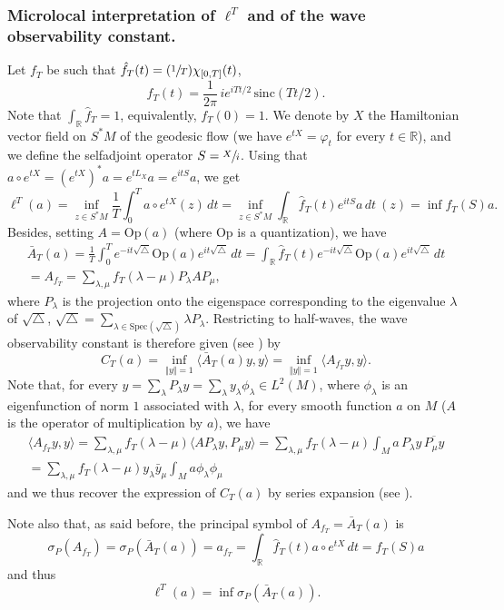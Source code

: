 \documentclass[10pt]{amsart}
\newcommand{\Psfrac}[2]{(\sfrac{#1}{#2})}
\def\R{\mathbb{R}}
\newcommand{\Op}{\mathrm{Op}}
\theoremstyle{definition}
\begin{document}
\subsubsection*{Microlocal interpretation of $\ell^T$ and of the wave observability constant.}
Let $f_T$ be such that $\hat f_T(t) = \Psfrac{1}{T}\chi_{[0,T]}(t)$, \ie
\[
f_T(t)=\frac{1}{2\pi}\,ie^{iTt/2}\,\mathrm{sinc}(Tt/2).
\]
Note that $\int_\R \hat f_T=1$, \ie equivalently, $f_T(0)=1$.
We denote by $X$ the Hamiltonian vector field on $S^*M$ of the geodesic flow (we have $e^{tX}=\varphi_t$ for every $t\in\R$), and we define the selfadjoint operator $S=\sfrac{X}{i}$.
Using that $a\circ e^{tX} = (e^{tX})^*a=e^{tL_X}a=e^{itS}a$, we get
\[
\ell^T(a) = \inf_{z\in S^*M} \frac{1}{T} \int_0^T a\circ e^{tX}(z)\, dt
= \inf_{z\in S^*M} \int_\R \hat f_T(t) e^{itS}a\, dt\ (z)
= \inf f_T(S)a.
\]
Besides, setting $A=\Op(a)$ (where $\Op$ is a quantization), we have
\begin{multline*}
\bar A_T(a) = \frac{1}{T} \int_0^T e^{-it\sqrt{\triangle}} \Op(a) e^{it\sqrt{\triangle}}\, dt
= \int_\R \hat f_T(t) e^{-it\sqrt{\triangle}} \Op(a) e^{it\sqrt{\triangle}}\, dt \\
= A_{f_T} = \sum_{\lambda,\mu} f_T(\lambda-\mu) P_\lambda A P_\mu,
\end{multline*}
{where $P_\lambda$ is the projection onto the eigenspace corresponding to the eigenvalue $\lambda$ of $\sqrt{\triangle}$, \ie $\sqrt{\triangle} = \sum_{\lambda\in\mathrm{Spec}(\sqrt{\triangle})} \lambda P_\lambda$.}
Restricting to half-waves, the wave observability constant is therefore given (see \cite{hpt}) by
\[
C_T(a) = \inf_{\Vert y\Vert=1} \langle \bar A_T(a) y,y\rangle = \inf_{\Vert y\Vert=1} \langle A_{f_T} y,y\rangle.
\]
Note that, {for every $y=\sum_\lambda P_\lambda y=\sum_\lambda y_\lambda\phi_\lambda\in L^2(M)$, where $\phi_\lambda$ is an eigenfunction of norm $1$ associated with $\lambda$, for every smooth function $a$ on $M$ (\ie $A$ is the operator of multiplication by $a$), we have}
\begin{multline*}
\langle A_{f_T} y,y\rangle = \sum_{\lambda,\mu} f_T(\lambda-\mu) \langle AP_\lambda y, P_\mu y\rangle
= \sum_{\lambda,\mu} f_T(\lambda-\mu) \int_M a \, P_\lambda y\, \overline{P_\mu y} \\
= \sum_{\lambda,\mu} f_T(\lambda-\mu) y_\lambda \bar y_\mu \int_M a \phi_\lambda \phi_\mu
\end{multline*}
and we thus recover the expression of $C_T(a)$ by series expansion (see \cite{hpt}).

Note also that, as said before, the principal symbol of $A_{f_T}=\bar A_T(a)$ is
\[
\sigma_P(A_{f_T}) = \sigma_P(\bar A_T(a)) = a_{f_T} = \int_\R \hat f_T(t) a\circ e^{tX}\, dt = f_T(S)a
\]
and thus
\[
\ell^T(a) = \inf \sigma_P(\bar A_T(a)).
\]
\end{document}
